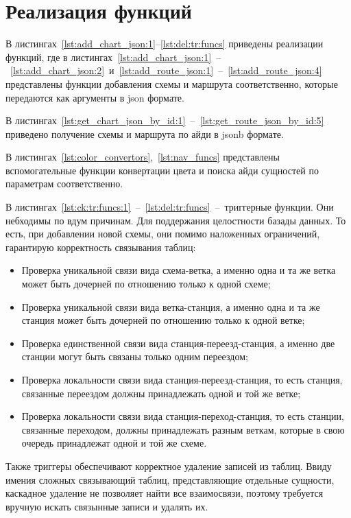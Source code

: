 \section{Реализация функций}
В листингах~\ref{lst:add_chart_json:1}--\ref{lst:del:tr:funcs}
приведены реализации функций, где в листингах~\ref{lst:add_chart_json:1}~--~\ref{lst:add_chart_json:2}~и~\ref{lst:add_route_json:1}~--~\ref{lst:add_route_json:4}
представлены функции добавления схемы и маршрута соответственно,
которые передаются как аргументы в json формате.

В листингах~\ref{lst:get_chart_json_by_id:1}~--~\ref{lst:get_route_json_by_id:5}
приведено получение схемы и маршрута по айди в jsonb формате.

В листингах~\ref{lst:color_convertors},~\ref{lst:nav_funcs}
представлены вспомогательные функции конвертации цвета и поиска айди сущностей
по параметрам соответственно.

В листингах~\ref{lst:ck:tr:funcs:1}~--~\ref{lst:del:tr:funcs}~--~триггерные функции.
Они небходимы по вдум причинам. Для поддержания целостности базады данных. То есть,
при добавлении новой схемы, они помимо наложенных ограничений, гарантирую корректность
связывания таблиц:

\begin{itemize}
	\item[---] Проверка уникальной связи вида схема-ветка, а именно одна и та же ветка может быть дочерней по отношению только к одной схеме;
	\item[---] Проверка уникальной связи вида ветка-станция, а именно одна и та же станция может быть дочерней по отношению только к одной ветке;
	\item[---] Проверка единственной связи вида станция-переезд-станция, а именно две станции могут быть связаны только одним переездом;
	\item[---] Проверка локальности связи вида станция-переезд-станция, то есть станция, связанные переездом должны принадлежать одной и той же ветке;
	\item[---] Проверка локальности связи вида станция-переход-станция, то есть станции, связанные переходом, должны принадлежать разным веткам, которые в свою очередь принадлежат одной и той же схеме.
\end{itemize}

Также триггеры обеспечивают корректное удаление записей из таблиц. Ввиду имения сложных связывающий таблиц,
представляющие отдельные сущности, каскадное удаление не позволяет найти все взаимосвязи, поэтому требуется
вручную искать связынные записи и удалять их.

